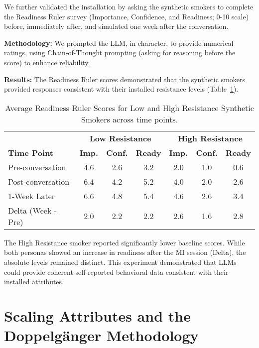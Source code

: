We further validated the installation by asking the synthetic smokers to complete the Readiness Ruler survey (Importance, Confidence, and Readiness; 0-10 scale) before, immediately after, and simulated one week after the conversation.

\textbf{Methodology:} We prompted the LLM, in character, to provide numerical ratings, using Chain-of-Thought prompting (asking for reasoning before the score) to enhance reliability.

\textbf{Results:} The Readiness Ruler scores demonstrated that the synthetic smokers provided responses consistent with their installed resistance levels (Table~\ref{tab:resistance-readiness-rulers}).

\begin{table}[h!]
\centering
\caption{Average Readiness Ruler Scores for Low and High Resistance Synthetic Smokers across time points.}
\label{tab:resistance-readiness-rulers}
\begin{tabular}{@{}l|ccc|ccc@{}}
\toprule
 & \multicolumn{3}{c|}{\textbf{Low Resistance}} & \multicolumn{3}{c}{\textbf{High Resistance}} \\
\textbf{Time Point} & \textbf{Imp.} & \textbf{Conf.} & \textbf{Ready} & \textbf{Imp.} & \textbf{Conf.} & \textbf{Ready} \\ \midrule
Pre-conversation & 4.6 & 2.6 & 3.2 & 2.0 & 1.0 & 0.6 \\
Post-conversation & 6.4 & 4.2 & 5.2 & 4.0 & 2.0 & 2.6 \\
1-Week Later & 6.6 & 4.8 & 5.4 & 4.6 & 2.6 & 3.4 \\ \midrule
Delta (Week - Pre) & 2.0 & 2.2 & 2.2 & 2.6 & 1.6 & 2.8 \\ \bottomrule
\end{tabular}
\end{table}

The High Resistance smoker reported significantly lower baseline scores. While both personas showed an increase in readiness after the MI session (Delta), the absolute levels remained distinct. This experiment demonstrated that LLMs could provide coherent self-reported behavioral data consistent with their installed attributes.

\section{Scaling Attributes and the Doppelgänger Methodology}
\label{sec:synthetic-smoker-doppelganger}

